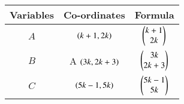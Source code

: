 \begin{tabular}[12pt]{ |c| c| c|}
\hline
\textbf{Variables} & \textbf{Co-ordinates} & \textbf{Formula} \\
\hline
$A$ & $\left(k + 1, 2k\right)$ & $\begin{pmatrix}k + 1\\2k\end{pmatrix}$\\
\hline
$B$ & A $\left(3k, 2k + 3\right)$ & $\begin{pmatrix}3k\\2k + 3\end{pmatrix}$\\
\hline
$C$ & $\left(5k - 1, 5k\right)$ & $\begin{pmatrix}5k - 1\\5k\end{pmatrix}$\\
\hline
\end{tabular}

